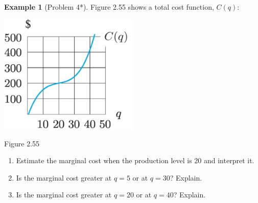 \documentclass[oneside]{book}
\theoremstyle{definition}
\newtheorem{example}{Example}
\theoremstyle{solution}
\begin{document}
\begin{example}[Problem 4*]
Figure 2.55 shows a total cost function, $C(q)$:
  \begin{center}
\includegraphics[width=0.5\textwidth]{Images/s2-5prob4}

{\Large Figure 2.55}
  \end{center}

\begin{enumerate}
\item Estimate the marginal cost when the production level is
  20 and interpret it.

\item Is the marginal cost greater at $q = 5$ or at $q = 30$?
  Explain.

\item Is the marginal cost greater at $q = 20$ or at $q = 40$?
Explain.
\end{enumerate}
\end{example}
\end{document}
